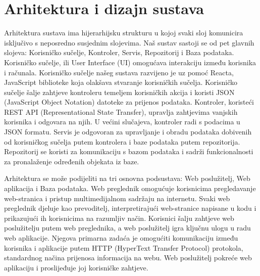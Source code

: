 

\chapter{Arhitektura i dizajn sustava}
		
		 Arhitektura sustava ima hijerarhijsku strukturu u kojoj svaki sloj komunicira isključivo s neposredno susjednim slojevima. Naš sustav sastoji se od pet glavnih slojeva: Korisničko sučelje, Kontroler, Servis, Repozitorij i Baza podataka. Korisničko sučelje, ili User Interface (UI) omogućava interakciju između korisnika i računala. Korisničko sučelje našeg sustava razvijeno je uz pomoć Reacta, JavaScript biblioteke koja olakšava stvaranje korisničkih sučelja. Korisničko sučelje šalje zahtjeve kontroleru temeljem korisničkih akcija i koristi JSON (JavaScript Object Notation) datoteke za prijenos podataka. Kontroler, koristeći REST API (Representational State Transfer), upravlja zahtjevima vanjskih korisnika i odgovara na njih. U većini slučajeva, kontroler radi s podacima u JSON formatu. Servis je odgovoran za upravljanje i obradu podataka dobivenih od korisničkog sučelja putem kontrolera i baze podataka putem repozitorija. Repozitorij se koristi za komunikaciju s bazom podataka i sadrži funkcionalnosti za pronalaženje određenih objekata iz baze.	

		Arhitektura se može podijeliti na tri osnovna podsustava: Web poslužitelj, Web aplikacija i Baza podataka. Web preglednik omogućuje korisnicima pregledavanje web-stranica i pristup multimedijalnom sadržaju na internetu. Svaki web preglednik djeluje kao prevoditelj, interpretirajući web-stranice napisane u kodu i prikazujući ih korisnicima na razumljiv način. Korisnici šalju zahtjeve web poslužitelju putem web preglednika, a web poslužitelj igra ključnu ulogu u radu web aplikacije. Njegova primarna zadaća je omogućiti komunikaciju između korisnika i aplikacije putem HTTP (HyperText Transfer Protocol) protokola, standardnog načina prijenosa informacija na webu. Web poslužitelj pokreće web aplikaciju i proslijeđuje joj korisničke zahtjeve.

